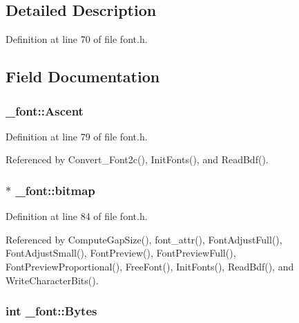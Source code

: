 \subsection{Detailed Description}


Definition at line 70 of file font.\-h.



\subsection{Field Documentation}
\hypertarget{struct__font_a998e54724f56879aa85c5ec169873f39}{
\subsubsection[{Ascent}]{ \-\_\-font\-::\-Ascent}}\label{struct__font_a998e54724f56879aa85c5ec169873f39}


Definition at line 79 of file font.\-h.



Referenced by Convert\-\_\-\-Font2c(), Init\-Fonts(), and Read\-Bdf().

\hypertarget{struct__font_a336f543c3fe3d3197c6e709fa7df0f5b}{
\subsubsection[{bitmap}]{ $\ast$ \-\_\-font\-::bitmap}}\label{struct__font_a336f543c3fe3d3197c6e709fa7df0f5b}


Definition at line 84 of file font.\-h.



Referenced by Compute\-Gap\-Size(), font\-\_\-attr(), Font\-Adjust\-Full(), Font\-Adjust\-Small(), Font\-Preview(), Font\-Preview\-Full(), Font\-Preview\-Proportional(), Free\-Font(), Init\-Fonts(), Read\-Bdf(), and Write\-Character\-Bits().

\hypertarget{struct__font_a13b0b0e4e91f4d663ba4c3c11bfbda8a}{
\subsubsection[{Bytes}]{\setlength{\rightskip}{0pt plus 5cm}int \-\_\-font\-::\-Bytes}}\label{struct__font_a13b0b0e4e91f4d663ba4c3c11bfbda8a}


